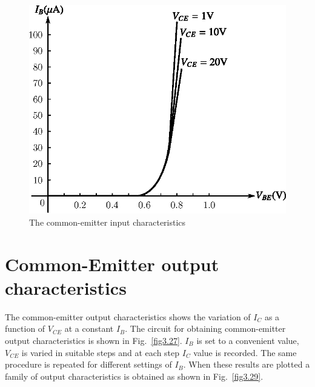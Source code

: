 \begin{figure}[H]
\centering
\includegraphics{chap2/S3-EE-03-028.eps}
\caption{The common-emitter input characteristics}\label{addfig3.28}
\end{figure}

\section{Common-Emitter output characteristics}\label{sec3.21}

The common-emitter output characteristics shows the variation of $I_{C}$ as a function of $V_{CE}$ at a constant $I_{B}$. The circuit for obtaining common-emitter output characteristics is shown in Fig.~\ref{fig3.27}. $I_{B}$ is set to a convenient value, $V_{CE}$ is varied in suitable steps and at each step $I_{C}$ value is recorded. The same procedure is repeated for different settings of $I_{B}$. When these results are plotted a family of output characteristics is obtained as shown in Fig.~\ref{fig3.29}.

